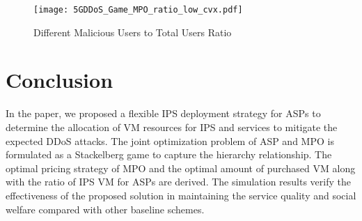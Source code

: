 \documentclass[conference]{IEEEtran}
\begin{document}
\begin{figure}[!ht]
  \texttt{[image: 5GDDoS\_Game\_MPO\_ratio\_low\_cvx.pdf]}
    \caption{Different Malicious Users to Total Users Ratio}
\label{fig:ratio_mpo_low}
\end{figure}





\section{Conclusion} \label{sec:conclusion}
In the paper, we proposed a flexible IPS deployment strategy for ASPs to determine the allocation of VM resources for IPS and services to mitigate the expected DDoS attacks. The joint optimization problem of ASP and MPO is formulated as a Stackelberg game to capture the hierarchy relationship. The optimal pricing strategy of MPO and the optimal amount of purchased VM along with the ratio of IPS VM for ASPs are derived. The simulation results verify the effectiveness of the proposed solution in maintaining the service quality and social welfare compared with other baseline schemes.




\end{document}
